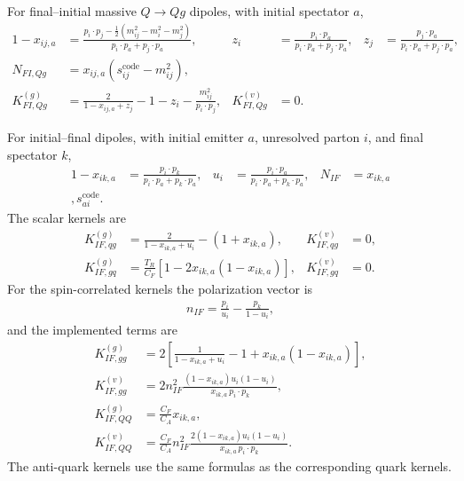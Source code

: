 \documentclass[11pt]{article}
\begin{document}
For final--initial massive $Q\to Qg$ dipoles, with initial spectator $a$,
\begin{align}
1-x_{ij,a} &= \frac{p_i\!\cdot p_j-\frac12(m_{ij}^2-m_i^2-m_j^2)}{p_i\!\cdot p_a+p_j\!\cdot p_a},
&z_i&=\frac{p_i\!\cdot p_a}{p_i\!\cdot p_a+p_j\!\cdot p_a},
&z_j&=\frac{p_j\!\cdot p_a}{p_i\!\cdot p_a+p_j\!\cdot p_a},\\
N_{FI,Qg} &= x_{ij,a}(s_{ij}^{\text{code}}-m_{ij}^2),\\
K^{(g)}_{FI,Qg} &= \frac{2}{1-x_{ij,a}+z_j}-1-z_i-\frac{m_{ij}^2}{p_i\!\cdot p_j},
&K^{(v)}_{FI,Qg}&=0.
\end{align}

For initial--final dipoles, with initial emitter $a$, unresolved parton $i$, and final spectator $k$,
\begin{align}
1-x_{ik,a} &= \frac{p_i\!\cdot p_k}{p_i\!\cdot p_a+p_k\!\cdot p_a},
&u_i&=\frac{p_i\!\cdot p_a}{p_i\!\cdot p_a+p_k\!\cdot p_a},
&N_{IF}&=x_{ik,a}\\,s_{ai}^{\text{code}}.
\end{align}
The scalar kernels are
\begin{align}
K^{(g)}_{IF,qg} &= \frac{2}{1-x_{ik,a}+u_i}-(1+x_{ik,a}),
&K^{(v)}_{IF,qg}&=0,\\
K^{(g)}_{IF,gq} &= \frac{T_R}{C_F}\left[1-2x_{ik,a}(1-x_{ik,a})\right],
&K^{(v)}_{IF,gq}&=0.
\end{align}
For the spin-correlated kernels the polarization vector is
\begin{align}
n_{IF}=\frac{p_i}{u_i}-\frac{p_k}{1-u_i},
\end{align}
and the implemented terms are
\begin{align}
K^{(g)}_{IF,gg} &=2\left[\frac{1}{1-x_{ik,a}+u_i}-1+x_{ik,a}(1-x_{ik,a})\right],\\
K^{(v)}_{IF,gg} &=2 n_{IF}^2\frac{(1-x_{ik,a})u_i(1-u_i)}{x_{ik,a}\,p_i\!\cdot p_k},\\
K^{(g)}_{IF,QQ} &=\frac{C_F}{C_A}x_{ik,a},\\
K^{(v)}_{IF,QQ} &=\frac{C_F}{C_A}n_{IF}^2\frac{2(1-x_{ik,a})u_i(1-u_i)}{x_{ik,a}\,p_i\!\cdot p_k}.
\end{align}
The anti-quark kernels use the same formulas as the corresponding quark kernels.
\end{document}
